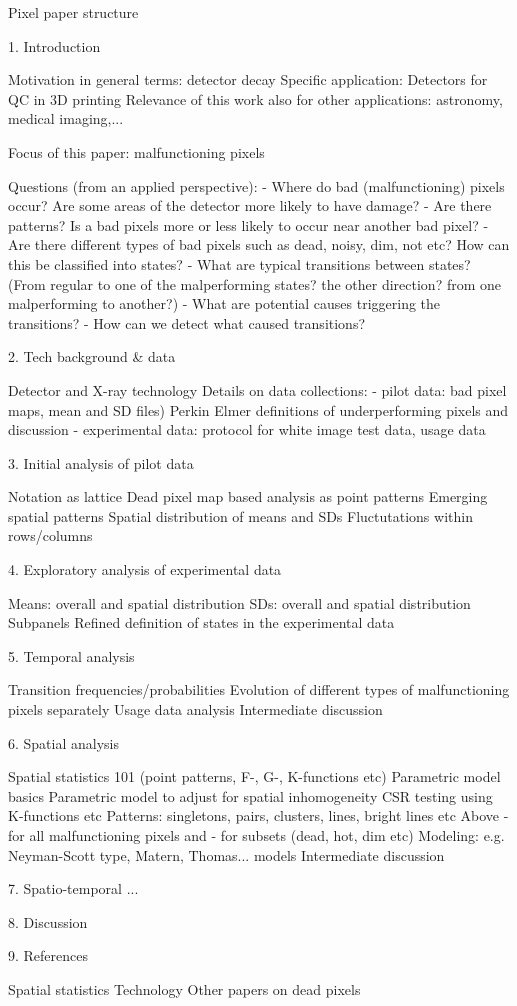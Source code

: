 Pixel paper structure

1. Introduction

Motivation in general terms: detector decay
Specific application: Detectors for QC in 3D printing 
Relevance of this work also for other applications: astronomy, medical imaging,...

Focus of this paper: malfunctioning pixels

Questions (from an applied perspective):
- Where do bad (malfunctioning) pixels occur? Are some areas of the detector more likely to have damage?
- Are there patterns? Is a bad pixels more or less likely to occur near another bad pixel?
- Are there different types of bad pixels such as dead, noisy, dim, not etc? How can this be classified into states?
- What are typical transitions between states? (From regular to one of the malperforming states? the other direction? from one malperforming to another?)
- What are potential causes triggering the transitions? 
- How can we detect what caused transitions?

2. Tech background & data 

Detector and X-ray technology
Details on data collections: 
- pilot data: bad pixel maps, mean and SD files)
  Perkin Elmer definitions of underperforming pixels and discussion
- experimental data: protocol for white image test data, usage data

3. Initial analysis of pilot data

Notation as lattice
Dead pixel map based analysis as point patterns
Emerging spatial patterns
Spatial distribution of means and SDs
Fluctutations within rows/columns

4. Exploratory analysis of experimental data

Means: overall and spatial distribution
SDs: overall and spatial distribution
Subpanels
Refined definition of states in the experimental data

5. Temporal analysis

Transition frequencies/probabilities
Evolution of different types of malfunctioning pixels separately
Usage data analysis
Intermediate discussion

6. Spatial analysis

Spatial statistics 101 (point patterns, F-, G-, K-functions etc)
Parametric model basics
Parametric model to adjust for spatial inhomogeneity
CSR testing using K-functions etc
Patterns: singletons, pairs, clusters, lines, bright lines etc
Above 
- for all malfunctioning pixels and 
- for subsets (dead, hot, dim etc)
Modeling: e.g. Neyman-Scott type, Matern, Thomas... models
Intermediate discussion

7. Spatio-temporal
...

8. Discussion

9. References

Spatial statistics
Technology
Other papers on dead pixels


